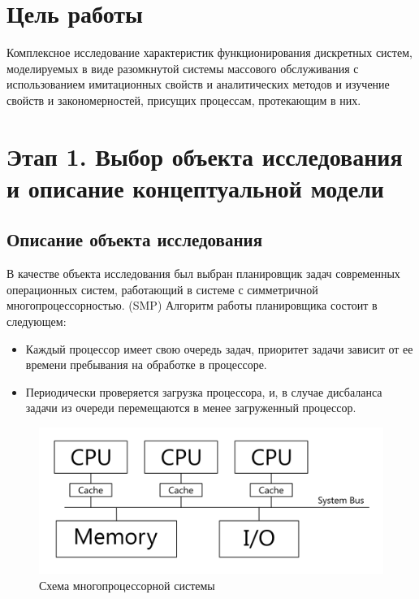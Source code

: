 

\usepackage{graphicx}
\usepackage{adjustbox}
\usepackage{multirow}

\def \labtype {Курсовая}
\def \labsubj {Моделирование}
\def \labauthor {Айтуганов Д. А. \\ Чебыкин И. Б.}
\def \labgroup {P3301}
\def \labinsp {Муравьева-Витковская Л. А.}
\def \labname{Творческая работа: Моделирование многопроцессорного планировщика задач}
\isonefalse
\isnumfalse
\isnametrue


\lstset{
	caption=\lstname,
	basicstyle=\ttfamily\selectfont\scriptsize
}


\tableofcontents
\newpage
\section{Цель работы}
Комплексное исследование характеристик функционирования дискретных систем,
моделируемых в виде разомкнутой системы массового обслуживания с использованием
имитационных свойств и аналитических методов и изучение свойств и
закономерностей, присущих процессам, протекающим в них.
\section{Этап 1. Выбор объекта исследования и описание концептуальной модели}
\subsection{Описание объекта исследования}
В качестве объекта исследования был выбран планировщик задач современных
операционных систем, работающий в системе с симметричной многопроцессорностью.
(SMP)
Алгоритм работы планировщика состоит в следующем:
\begin{itemize}
\item Каждый процессор имеет свою очередь задач, приоритет задачи зависит от ее
времени пребывания на обработке в процессоре.
\item Периодически проверяется загрузка процессора, и, в случае
дисбаланса задачи из очереди перемещаются в менее загруженный процессор.
\end{itemize}
\begin{figure}[h]
\centering
\includegraphics[resolution=96]{img/smp.png}
\caption{Схема многопроцессорной системы}
\end{figure}

